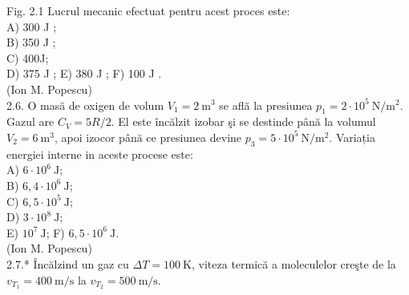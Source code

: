 \documentclass[10pt]{article}
\begin{document}
Fig. 2.1 Lucrul mecanic efectuat pentru acest proces este:\\
A) 300 J ;\\
B) 350 J ;\\
C) 400J;\\
D) 375 J ; E) 380 J ; F) 100 J .\\
(Ion M. Popescu)\\
2.6. O masă de oxigen de volum $V_{1}=2 \mathrm{~m}^{3}$ se află la presiunea $p_{1}=2 \cdot 10^{5} \mathrm{~N} / \mathrm{m}^{2}$. Gazul are $C_{V}=5 R / 2$. El este încălzit izobar şi se destinde până la volumul $V_{2}=6 \mathrm{~m}^{3}$, apoi izocor până ce presiunea devine $p_{3}=5 \cdot 10^{5} \mathrm{~N} / \mathrm{m}^{2}$. Variația energiei interne in aceste procese este:\\
A) $6 \cdot 10^{6} \mathrm{~J}$;\\
B) $6,4 \cdot 10^{6} \mathrm{~J}$;\\
C) $6,5 \cdot 10^{5} \mathrm{~J}$;\\
D) $3 \cdot 10^{8} \mathrm{~J}$;\\
E) $10^{7} \mathrm{~J}$; F) $6,5 \cdot 10^{6} \mathrm{~J}$.\\
(Ion M. Popescu)\\
2.7.* Încălzind un gaz cu $\Delta T=100 \mathrm{~K}$, viteza termică a moleculelor creşte de la $v_{T_{1}}=400 \mathrm{~m} / \mathrm{s}$ la $v_{T_{2}}=500 \mathrm{~m} / \mathrm{s}$.
\end{document}
